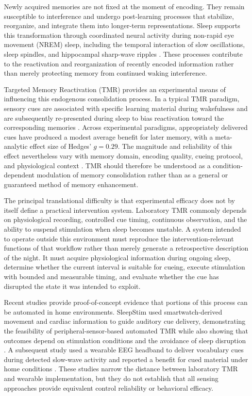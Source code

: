 Newly acquired memories are not fixed at the moment of encoding. They remain
susceptible to interference and undergo post-learning processes that stabilize,
reorganize, and integrate them into longer-term representations. Sleep supports
this transformation through coordinated neural activity during non-rapid eye
movement (NREM) sleep, including the temporal interaction of slow oscillations,
sleep spindles, and hippocampal sharp-wave ripples
\citep{diekelmann2010memory,rasch2013sleep,klinzing2019mechanisms}.
These processes contribute to the reactivation and reorganization of recently
encoded information rather than merely protecting memory from continued waking
interference.

Targeted Memory Reactivation (TMR) provides an experimental means of influencing
this endogenous consolidation process. In a typical TMR paradigm, sensory cues
are associated with specific learning material during wakefulness and are
subsequently re-presented during sleep to bias reactivation toward the
corresponding memories \citep{oudiette2013upgrading}. Across experimental
paradigms, appropriately delivered cues have produced a modest average benefit
for later memory, with a meta-analytic effect size of Hedges'
\(g=0.29\). The magnitude and reliability of this effect nevertheless vary with
memory domain, encoding quality, cueing protocol, and physiological context
\citep{hu2020promoting}. TMR should therefore be understood as a
condition-dependent modulation of memory consolidation rather than as a general
or guaranteed method of memory enhancement.

The principal translational difficulty is that experimental efficacy does not
by itself define a practical intervention system. Laboratory TMR commonly
depends on physiological recording, controlled cue timing, continuous
observation, and the ability to suspend stimulation when sleep becomes unstable.
A system intended to operate outside this environment must reproduce the
intervention-relevant functions of that workflow rather than merely generate a
retrospective description of the night. It must acquire physiological
information during ongoing sleep, determine whether the current interval is
suitable for cueing, execute stimulation with bounded and measurable timing,
and evaluate whether the cue has disrupted the state it was intended to exploit.

Recent studies provide proof-of-concept evidence that portions of this process
can be automated in home environments. SleepStim used smartwatch-derived
movement and cardiac information to guide auditory cue delivery, demonstrating
the feasibility of peripheral-sensor-based automated TMR while also showing that
outcomes depend on stimulation conditions and the avoidance of sleep disruption
\citep{whitmore2022improving}. A subsequent study used a wearable EEG
headband to deliver vocabulary cues during detected slow-wave activity and
reported a benefit for cued material under home conditions
\citep{salfi2025promoting}. These studies narrow the distance between
laboratory TMR and wearable implementation, but they do not establish that all
sensing approaches provide equivalent control reliability or behavioral
efficacy.

